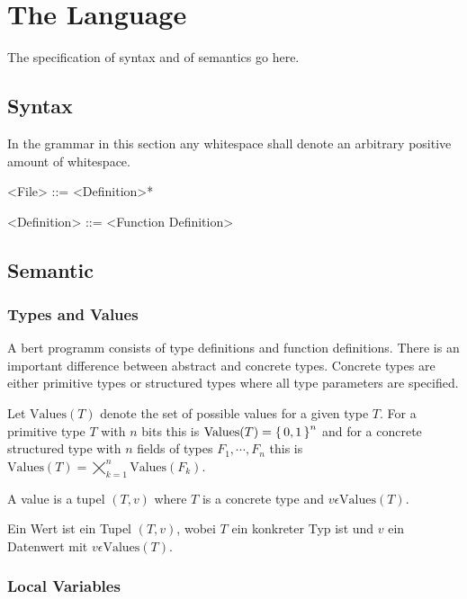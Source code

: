 
\section{The Language}

The specification of syntax and of semantics go here.

\subsection{Syntax}

In the grammar in this section any whitespace shall denote an arbitrary positive amount of whitespace.

\begin{grammar}
	<File> ::= <Definition>*

	<Definition> ::= <Function Definition>
		\alt <Type Definition>

\end{grammar}

\subsection{Semantic}

\subsubsection{Types and Values}

\newcommand{\values}{\text{Values}}

A bert programm consists of type definitions and function definitions. There is an important difference between abstract and concrete types. Concrete types are either primitive types or structured types where all type parameters are specified.

\medskip

Let $\values(T)$ denote the set of possible values for a given type $T$. For a primitive type $T$ with $n$ bits this is $\values(T) = \set{0,1}^n$ and for a concrete structured type with $n$ fields of types $F_1, \cdots, F_n$ this is $\values(T) = \bigtimes_{k=1}^n \values(F_k)$.

\medskip

A value is a tupel $(T, v)$ where $T$ is a concrete type and $vϵ\values(T)$.

Ein Wert ist ein Tupel $(T, v)$, wobei $T$ ein konkreter Typ ist und $v$ ein Datenwert
mit $v ϵ \values(T)$.

\subsubsection{Local Variables}

